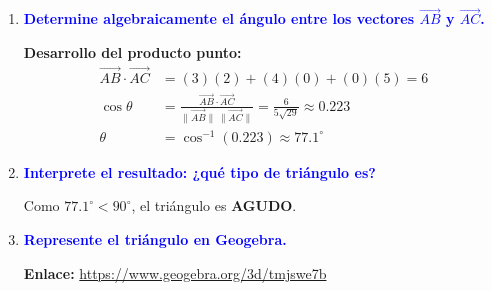 \begin{enumerate}[label=\textbf{\arabic*.}, itemsep=1em, leftmargin=2em]
    \item \textcolor{blue}{\textbf{Determine algebraicamente el ángulo entre los vectores $\overrightarrow{AB}$ y $\overrightarrow{AC}$.}}
    
    \begin{center}
    \colorbox{red!5}{\begin{minipage}{0.9\textwidth}
    \vspace{0.3cm}
    \textbf{Desarrollo del producto punto:}
    \begin{align*}
        \vec{AB}\cdot\vec{AC} &= (3)(2) + (4)(0) + (0)(5) = 6 \\
        \cos \theta &= \frac{\vec{AB}\cdot\vec{AC}}{\|\vec{AB}\|\,\|\vec{AC}\|} = \frac{6}{5\sqrt{29}} \approx 0.223 \\
        \theta &= \cos^{-1}(0.223) \approx \boxed{77.1^\circ}
    \end{align*}
    \vspace{0.2cm}
    \end{minipage}}
    \end{center}

    \item \textcolor{blue}{\textbf{Interprete el resultado: ¿qué tipo de triángulo es?}}
    
    \begin{center}
    \colorbox{yellow!5}{\begin{minipage}{0.9\textwidth}
    \vspace{0.3cm}
    Como $77.1^\circ < 90^\circ$, el triángulo es \textbf{AGUDO}.
    \vspace{0.3cm}
    \end{minipage}}
    \end{center}
    
    \item \textcolor{blue}{\textbf{Represente el triángulo en Geogebra.}}
    
    \begin{center}
    \colorbox{gray!5}{\begin{minipage}{0.9\textwidth}
    \vspace{0.3cm}
    \begin{center}
    \textbf{Enlace:} \url{https://www.geogebra.org/3d/tmjswe7b}
    \end{center}
    \vspace{0.3cm}
    \end{minipage}}
    \end{center}
\end{enumerate}